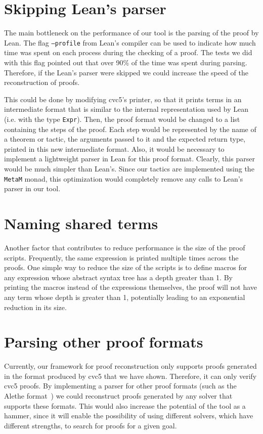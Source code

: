 \section{Skipping Lean's parser}

The main bottleneck on the performance of our tool is the parsing
of the proof by Lean. The flag \texttt{--profile} from
Lean's compiler can be used to indicate how much time was spent on each
process during the checking of a proof. The tests we did with
this flag pointed out that over 90\% of the time was spent
during parsing. Therefore, if the Lean's parser were skipped we could
increase the speed of the reconstruction of proofs.

This could be done by modifying
cvc5's printer, so that it prints terms in an intermediate format
that is similar to the internal representation used by Lean (i.e.
with the type \texttt{Expr}). Then, the proof format would be changed
to a list containing the steps of the proof. Each step would be
represented by the name of a theorem or tactic, the arguments passed to it and the expected return type, printed in
this new intermediate format. Also, it would be necessary to implement
a lightweight parser in Lean for this proof format. Clearly, this parser
would be much simpler than Lean's. Since our tactics are implemented
using the \texttt{MetaM} monad, this optimization would completely
remove any calls to Lean's parser in our tool.

\section{Naming shared terms}

Another factor that contributes to reduce performance is the size of
the proof scripts. Frequently, the same expression is printed multiple
times across the proofs. One simple way to reduce the size of the
scripts is to define macros for any expression whose abstract syntax
tree has a depth greater than 1. By printing the macros instead
of the expressions themselves, the proof will not have any
term whose depth is greater than 1, potentially leading to
an exponential reduction in its size.

\section{Parsing other proof formats}

Currently, our framework for proof reconstruction only supports
proofs generated in the format produced by cvc5 that we have shown.
Therefore, it can only verify cvc5 proofs. By implementing a
parser for other proof formats (such
as the Alethe format~\cite{alethe}) we could reconstruct proofs
generated by any solver that supports these formats.
This would also increase the potential of the tool as a hammer,
since it will enable the possibility of using different solvers,
which have different strengths, to search for proofs for a given
goal.


